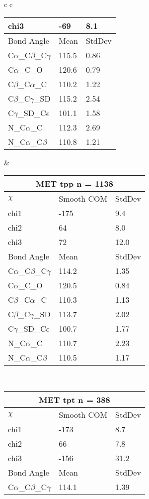 \begin{longtable}{ c c }
\begin{tabular}{ l l l }
  chi3 & -69 & 8.1 \\ \midrule
  Bond Angle   & Mean     & StdDev \\ \midrule
  C$\alpha$\_C$\beta$\_C$\gamma$ & 115.5 & 0.86\\
  C$\alpha$\_C\_O & 120.6 & 0.79\\
  C$\beta$\_C$\alpha$\_C & 110.2 & 1.22\\
  C$\beta$\_C$\gamma$\_SD & 115.2 & 2.54\\
  C$\gamma$\_SD\_C$\epsilon$ & 101.1 & 1.58\\
  N\_C$\alpha$\_C & 112.3 & 2.69\\
  N\_C$\alpha$\_C$\beta$ & 110.8 & 1.21\\
  \bottomrule
  \end{tabular}
  &
  \begin{tabular}{ l l l }
  \toprule
  \multicolumn{3}{c}{MET \textbf{tpp} n = 1138} \\ \toprule
  $\chi$       & Smooth COM & StdDev \\ \midrule
  chi1 & -175 & 9.4 \\ 
  chi2 & 64 & 8.0 \\ 
  chi3 & 72 & 12.0 \\ \midrule
  Bond Angle   & Mean     & StdDev \\ \midrule
  C$\alpha$\_C$\beta$\_C$\gamma$ & 114.2 & 1.35\\
  C$\alpha$\_C\_O & 120.5 & 0.84\\
  C$\beta$\_C$\alpha$\_C & 110.3 & 1.13\\
  C$\beta$\_C$\gamma$\_SD & 113.7 & 2.02\\
  C$\gamma$\_SD\_C$\epsilon$ & 100.7 & 1.77\\
  N\_C$\alpha$\_C & 110.7 & 2.23\\
  N\_C$\alpha$\_C$\beta$ & 110.5 & 1.17\\
  \bottomrule
  \end{tabular}
  \\
  \begin{tabular}{ l l l }
  \toprule
  \multicolumn{3}{c}{MET \textbf{tpt} n = 388} \\ \toprule
  $\chi$       & Smooth COM & StdDev \\ \midrule
  chi1 & -173 & 8.7 \\ 
  chi2 & 66 & 7.8 \\ 
  chi3 & -156 & 31.2 \\ \midrule
  Bond Angle   & Mean     & StdDev \\ \midrule
  C$\alpha$\_C$\beta$\_C$\gamma$ & 114.1 & 1.39\\

\end{tabular}
\end{longtable}
